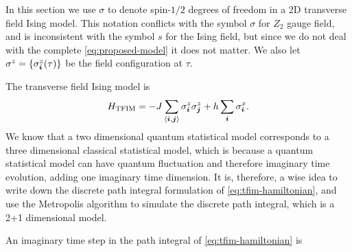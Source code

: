 \documentclass[hyperref, a4paper]{article}
\newcommand*{\pair}[1]{\langle #1 \rangle}
\newcommand*{\Ztwo}{$\mathbb{Z}_2$ }
\newcommand*{\tfim}{transverse field Ising model}
\def\mathbb#1{#1}%
\begin{document}
In this section we use $\sigma$ to denote spin-$1/2$ degrees of freedom in a 2D \tfim.
This notation conflicts with the symbol $\sigma$ for \Ztwo gauge field, 
and is inconsistent with the symbol $s$ for the Ising field, 
but since we do not deal with the complete \eqref{eq:proposed-model} it does not matter.
We also let $\sigma^z = \{\sigma^z_{\vb*{i}}(\tau)\}$ be the field configuration at $\tau$.

The \tfim{} is 
\begin{equation}
    H_\text{TFIM} = - J \sum_{\pair{\vb*{i}, \vb*{j}}} \sigma^z_{\vb*{i}} \sigma^z_{\vb*{j}} + h \sum_{\vb*{i}} \sigma^x_{\vb*{i}}.
    \label{eq:tfim-hamiltonian}
\end{equation}
We know that a two dimensional quantum statistical model corresponds to a three dimensional classical statistical model, which is because a quantum statistical model can have quantum fluctuation and therefore imaginary time evolution, adding one imaginary time dimension.
It is, therefore, a wise idea to write down the discrete path integral formulation of \eqref{eq:tfim-hamiltonian}, and use the Metropolis algorithm to simulate the discrete path integral, which is a 2+1 dimensional model.

An imaginary time step in the path integral of \eqref{eq:tfim-hamiltonian} is 
\end{document}
